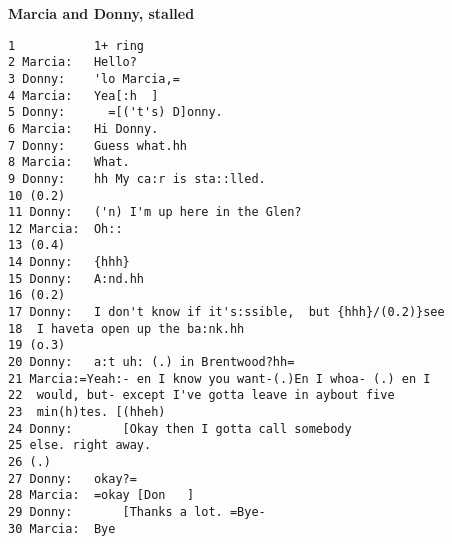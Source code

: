 \textbf{Marcia and Donny, stalled}
\begin{lstlisting}
1           1+ ring
2 Marcia:   Hello?
3 Donny:    'lo Marcia,=
4 Marcia:   Yea[:h  ]
5 Donny:      =[('t's) D]onny.
6 Marcia:   Hi Donny.
7 Donny:    Guess what.hh
8 Marcia:   What.
9 Donny:    hh My ca:r is sta::lled.
10 (0.2)
11 Donny:   ('n) I'm up here in the Glen?
12 Marcia:  Oh::
13 (0.4)
14 Donny:   {hhh}
15 Donny:   A:nd.hh
16 (0.2)
17 Donny:   I don't know if it's:ssible,  but {hhh}/(0.2)}see
18  I haveta open up the ba:nk.hh
19 (o.3)
20 Donny:   a:t uh: (.) in Brentwood?hh=
21 Marcia:=Yeah:- en I know you want-(.)En I whoa- (.) en I
22  would, but- except I've gotta leave in aybout five
23  min(h)tes. [(hheh)
24 Donny:       [Okay then I gotta call somebody
25 else. right away.
26 (.)
27 Donny:   okay?=
28 Marcia:  =okay [Don   ]
29 Donny:       [Thanks a lot. =Bye-
30 Marcia:  Bye
\end{lstlisting}